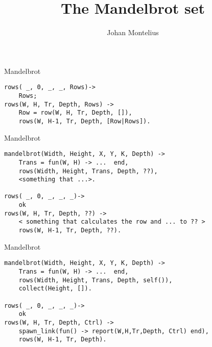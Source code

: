 

\title[ID1019 Parallel programming]{The Mandelbrot set}
 

\author{Johan Montelius}
\date{\semester}



\begin{frame}
\titlepage
\end{frame}

\begin{frame}[fragile]{Mandelbrot}

\begin{verbatim}
rows( _, 0, _, _, Rows)->
    Rows;
rows(W, H, Tr, Depth, Rows) ->
    Row = row(W, H, Tr, Depth, []),
    rows(W, H-1, Tr, Depth, [Row|Rows]).
\end{verbatim}

\pause\vspace{20pt}{\em How do we speed this up?}
\end{frame}

\begin{frame}[fragile]{Mandelbrot}

\begin{verbatim}
mandelbrot(Width, Height, X, Y, K, Depth) ->
    Trans = fun(W, H) -> ...  end,
    rows(Width, Height, Trans, Depth, ??),
    <something that ...>.

rows( _, 0, _, _, _)->
    ok
rows(W, H, Tr, Depth, ??) ->
    < something that calculates the row and ... to ?? >
    rows(W, H-1, Tr, Depth, ??).
\end{verbatim}

\end{frame}


\begin{frame}[fragile]{Mandelbrot}

\begin{verbatim}
mandelbrot(Width, Height, X, Y, K, Depth) ->
    Trans = fun(W, H) -> ...  end,
    rows(Width, Height, Trans, Depth, self()),
    collect(Height, []).

rows( _, 0, _, _, _)->
    ok
rows(W, H, Tr, Depth, Ctrl) ->
    spawn_link(fun() -> report(W,H,Tr,Depth, Ctrl) end),
    rows(W, H-1, Tr, Depth).
\end{verbatim}

\pause\vspace{20pt}{\em Write collect/2 and report/5, and give it a spin.}

\end{frame}

